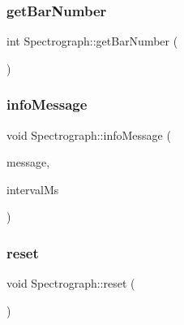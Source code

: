 \hypertarget{class_spectrograph_a4a7f2b78c288816942356f2452166211}{}\label{class_spectrograph_a4a7f2b78c288816942356f2452166211} 
\subsubsection{\texorpdfstring{get\+Bar\+Number}{getBarNumber}}
{\footnotesize\ttfamily int Spectrograph\+::get\+Bar\+Number (\begin{DoxyParamCaption}{ }\end{DoxyParamCaption})\hspace{0.3cm}{\ttfamily [slot]}}

\hypertarget{class_spectrograph_a1046b17fbd22d0724f06d461acb77bef}{}\label{class_spectrograph_a1046b17fbd22d0724f06d461acb77bef} 
\subsubsection{\texorpdfstring{info\+Message}{infoMessage}}
{\footnotesize\ttfamily void Spectrograph\+::info\+Message (\begin{DoxyParamCaption}\item[{const Q\+String \&}]{message,  }\item[{int}]{interval\+Ms }\end{DoxyParamCaption})\hspace{0.3cm}{\ttfamily [signal]}}

\hypertarget{class_spectrograph_a63c0355273ab24b5206817695421747d}{}\label{class_spectrograph_a63c0355273ab24b5206817695421747d} 
\subsubsection{\texorpdfstring{reset}{reset}}
{\footnotesize\ttfamily void Spectrograph\+::reset (\begin{DoxyParamCaption}{ }\end{DoxyParamCaption})\hspace{0.3cm}{\ttfamily [slot]}}

\hypertarget{class_spectrograph_ae267e7e06cb7eaec965150a73c21e4ce}{}\label{class_spectrograph_ae267e7e06cb7eaec965150a73c21e4ce} 
